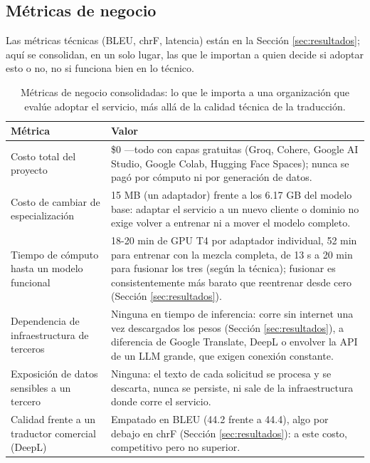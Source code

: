 \documentclass[11pt,a4paper]{article}
\begin{document}
\subsection{Métricas de negocio}
\label{sec:metricas-negocio}

Las métricas técnicas (BLEU, chrF, latencia) están en la Sección \ref{sec:resultados}; aquí se consolidan, en un solo lugar, las que le importan a quien decide si adoptar esto o no, no si funciona bien en lo técnico.

\begin{table}[h]
\centering
\small
\begin{tabular}{p{4.3cm}p{9.3cm}}
\toprule
\textbf{Métrica} & \textbf{Valor} \\
\midrule
Costo total del proyecto & \$0 —todo con capas gratuitas (Groq, Cohere, Google AI Studio, Google Colab, Hugging Face Spaces); nunca se pagó por cómputo ni por generación de datos. \\
\addlinespace
Costo de cambiar de especialización & 15 MB (un adaptador) frente a los 6.17 GB del modelo base: adaptar el servicio a un nuevo cliente o dominio no exige volver a entrenar ni a mover el modelo completo. \\
\addlinespace
Tiempo de cómputo hasta un modelo funcional & 18-20 min de GPU T4 por adaptador individual, 52 min para entrenar con la mezcla completa, de 13 s a 20 min para fusionar los tres (según la técnica); fusionar es consistentemente más barato que reentrenar desde cero (Sección \ref{sec:resultados}). \\
\addlinespace
Dependencia de infraestructura de terceros & Ninguna en tiempo de inferencia: corre sin internet una vez descargados los pesos (Sección \ref{sec:resultados}), a diferencia de Google Translate, DeepL o envolver la API de un LLM grande, que exigen conexión constante. \\
\addlinespace
Exposición de datos sensibles a un tercero & Ninguna: el texto de cada solicitud se procesa y se descarta, nunca se persiste, ni sale de la infraestructura donde corre el servicio. \\
\addlinespace
Calidad frente a un traductor comercial (DeepL) & Empatado en BLEU (44.2 frente a 44.4), algo por debajo en chrF (Sección \ref{sec:resultados}): a este costo, competitivo pero no superior. \\
\bottomrule
\end{tabular}
\caption{Métricas de negocio consolidadas: lo que le importa a una organización que evalúe adoptar el servicio, más allá de la calidad técnica de la traducción.}
\label{tab:metricas-negocio}
\end{table}
\end{document}

